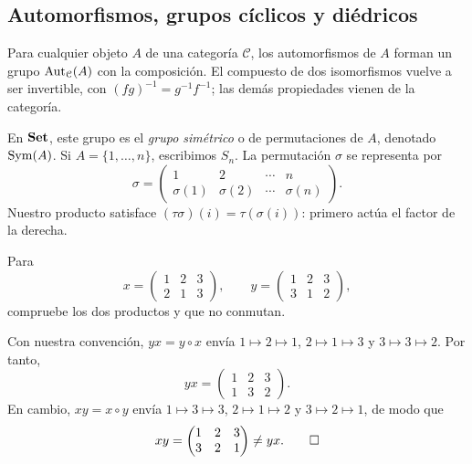 \subsection{Automorfismos, grupos cíclicos y diédricos}\label{tema:2-2-1}\label{tema:2-2-2}
Para cualquier objeto $A$ de una categoría $\mathcal C$, los automorfismos de $A$ forman un grupo $\operatorname{Aut}_{\mathcal C}(A)$ con la composición. El compuesto de dos isomorfismos vuelve a ser invertible, con $(fg)^{-1}=g^{-1}f^{-1}$; las demás propiedades vienen de la categoría.

En $\mathbf{Set}$, este grupo es el \emph{grupo simétrico} o de permutaciones de $A$, denotado $\operatorname{Sym}(A)$. Si $A=\{1,\ldots,n\}$, escribimos $S_n$. La permutación $\sigma$ se representa por
\[
\sigma=\begin{pmatrix}1&2&\cdots&n\\\sigma(1)&\sigma(2)&\cdots&\sigma(n)\end{pmatrix}.
\]
Nuestro producto satisface $(\tau\sigma)(i)=\tau(\sigma(i))$: primero actúa el factor de la derecha.

\begin{ejer}\label{ejer:C2-permutaciones}
Para
\[
x=\begin{pmatrix}1&2&3\\2&1&3\end{pmatrix},\qquad
y=\begin{pmatrix}1&2&3\\3&1&2\end{pmatrix},
\]
compruebe los dos productos y que no conmutan.
\end{ejer}
\begin{sol}
Con nuestra convención, $yx=y\circ x$ envía $1\mapsto2\mapsto1$, $2\mapsto1\mapsto3$ y $3\mapsto3\mapsto2$. Por tanto,
\[
yx=\begin{pmatrix}1&2&3\\1&3&2\end{pmatrix}.
\]
En cambio, $xy=x\circ y$ envía $1\mapsto3\mapsto3$, $2\mapsto1\mapsto2$ y $3\mapsto2\mapsto1$, de modo que
\[
xy=\begin{pmatrix}1&2&3\\3&2&1\end{pmatrix}\ne yx.\qedhere
\]
\end{sol}

